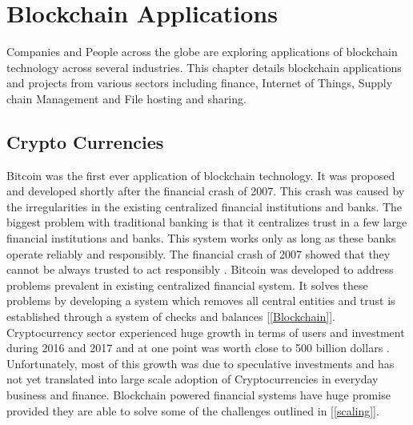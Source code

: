 \section{Blockchain Applications}
Companies and People across the globe are exploring applications of blockchain technology across several industries. This chapter details blockchain applications and projects from various sectors including finance, Internet of Things, Supply chain Management and File hosting and sharing. 
\subsection{Crypto Currencies}
Bitcoin was the first ever application of blockchain technology. It was proposed and developed shortly after the financial crash of 2007. This crash was caused by the irregularities in the existing centralized financial institutions and banks. The biggest problem with traditional banking is that it centralizes trust in a few large financial institutions and banks. This system works only as long as these banks operate reliably and responsibly. The financial crash of 2007 showed that they cannot be always trusted to act responsibly \cite{misc:009}. Bitcoin was developed to address problems prevalent in existing centralized financial system. It solves these problems by developing a system which removes all central entities and trust is established through a system of checks and balances [\ref{Blockchain}]. Cryptocurrency sector experienced huge growth in terms of users and investment during 2016 and 2017 and at one point was worth close to 500 billion dollars \cite{misc:010}. Unfortunately, most of this growth was due to speculative investments and has not yet translated into large scale adoption of Cryptocurrencies in everyday business and finance. Blockchain powered financial systems have huge promise provided they are able to solve some of the challenges outlined in [\ref{scaling}].
